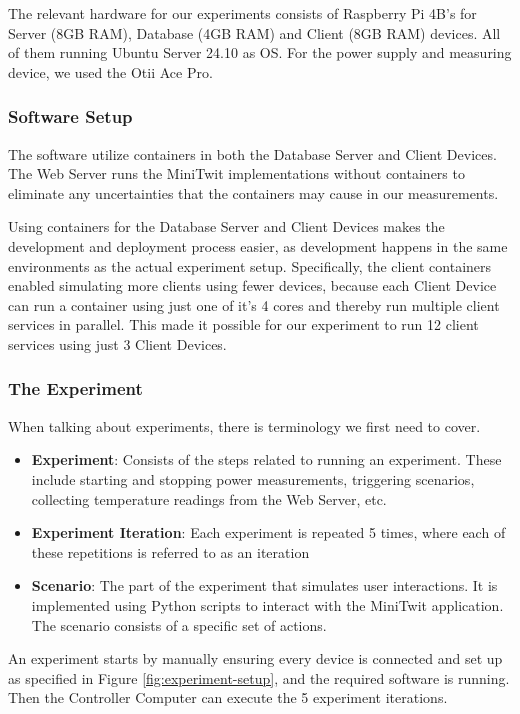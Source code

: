 \documentclass[main.tex]{subfiles}
\begin{document}
The relevant hardware for our experiments consists of Raspberry Pi 4B's for Server (8GB RAM), Database (4GB RAM) and Client (8GB RAM) devices. All of them running Ubuntu Server 24.10 as OS. For the power supply and measuring device, we used the Otii Ace Pro.  

\subsubsection{Software Setup}

The software utilize containers in both the Database Server and Client Devices. The Web Server runs the MiniTwit implementations without containers to eliminate any uncertainties that the containers may cause in our measurements.

Using containers for the Database Server and Client Devices makes the development and deployment process easier, as development happens in the same environments as the actual experiment setup. Specifically, the client containers enabled simulating more clients using fewer devices, because each Client Device can run a container using just one of it's 4 cores and thereby run multiple client services in parallel. This made it possible for our experiment to run 12 client services using just 3 Client Devices. 

\subsubsection{The Experiment}
When talking about experiments, there is terminology we first need to cover.

\begin{itemize}
    \item \textbf{Experiment}: Consists of the steps related to running an experiment. These include starting and stopping power measurements, triggering scenarios, collecting temperature readings from the Web Server, etc.
    \item \textbf{Experiment Iteration}: Each experiment is repeated 5 times, where each of these repetitions is referred to as an iteration
    \item \textbf{Scenario}: The part of the experiment that simulates user interactions. It is implemented using Python scripts to interact with the MiniTwit application. The scenario consists of a specific set of actions.
\end{itemize}

An experiment starts by manually ensuring every device is connected and set up as specified in Figure \ref{fig:experiment-setup}, and the required software is running. Then the Controller Computer can execute the 5 experiment iterations.
\end{document}
